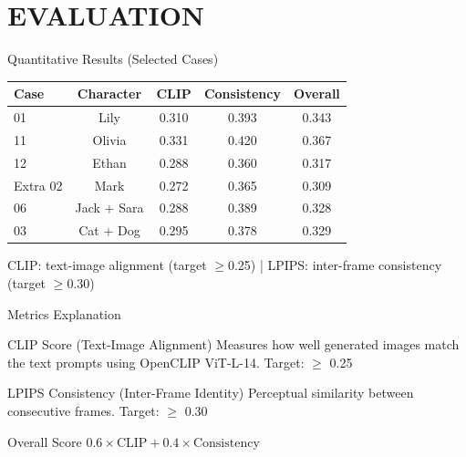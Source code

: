 \documentclass{beamer}
\begin{document}
\section{EVALUATION}
\begin{frame}{Quantitative Results (Selected Cases)}
    \footnotesize
    \begin{table}
        \begin{tabular}{|l|c|c|c|c|}
            \hline
            \textbf{Case} & \textbf{Character} & \textbf{CLIP} & \textbf{Consistency} & \textbf{Overall} \\
            \hline
            01 & Lily & 0.310 & 0.393 & 0.343 \\
            \hline
            11 & Olivia & 0.331 & 0.420 & 0.367 \\
            \hline
            12 & Ethan & 0.288 & 0.360 & 0.317 \\
            \hline
            Extra 02 & Mark & 0.272 & 0.365 & 0.309 \\
            \hline
            06 & Jack + Sara & 0.288 & 0.389 & 0.328 \\
            \hline
            03 & Cat + Dog & 0.295 & 0.378 & 0.329 \\
            \hline
        \end{tabular}
    \end{table}
    \vspace{0.5em}
    \tiny CLIP: text-image alignment (target $\geq$0.25) | LPIPS: inter-frame consistency (target $\geq$0.30)
\end{frame}

\begin{frame}{Metrics Explanation}
    \footnotesize
    \begin{block}{CLIP Score (Text-Image Alignment)}
        \footnotesize
        Measures how well generated images match the text prompts using OpenCLIP ViT-L-14. Target: $\geq$ 0.25
    \end{block}
    \begin{block}{LPIPS Consistency (Inter-Frame Identity)}
        \footnotesize
        Perceptual similarity between consecutive frames. Target: $\geq$ 0.30
    \end{block}
    \begin{block}{Overall Score}
        \footnotesize
        $0.6 \times \text{CLIP} + 0.4 \times \text{Consistency}$
    \end{block}
\end{frame}
\end{document}

